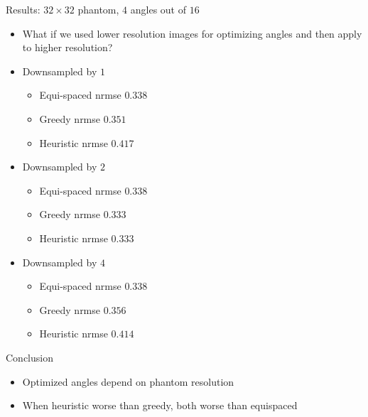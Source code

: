 \documentclass[english,aspectratio=43]{beamer}
\begin{document}
\begin{frame}{Results: $32 \times 32$ phantom, $4$ angles out of $16$ }
	\begin{itemize}
	    \setlength\itemsep{1.5em}
	    \item What if we used lower resolution images for optimizing angles and then apply to higher resolution?
	    
	     \item Downsampled by $1$
	    \begin{itemize}
    		\item Equi-spaced nrmse $0.338$
    		\item Greedy nrmse $0.351$
    		\item Heuristic nrmse $0.417$
    	\end{itemize}
	    
	    \item Downsampled by $2$
	    \begin{itemize}
    		\item Equi-spaced nrmse $0.338$
    		\item Greedy nrmse $0.333$
    		\item Heuristic nrmse $0.333$
    	\end{itemize}
	    
	    \item Downsampled by $4$
	    \begin{itemize}
    		\item Equi-spaced nrmse $0.338$
    		\item Greedy nrmse $0.356$
    		\item Heuristic nrmse $0.414$
    	\end{itemize}
        
	\end{itemize}
	
\end{frame}

\begin{frame}{Conclusion}
	\begin{itemize}
	    \setlength\itemsep{2em}
	    \item Optimized angles depend on phantom resolution
	    \item When heuristic worse than greedy, both worse than equispaced
	\end{itemize}
	
\end{frame}
\end{document}
